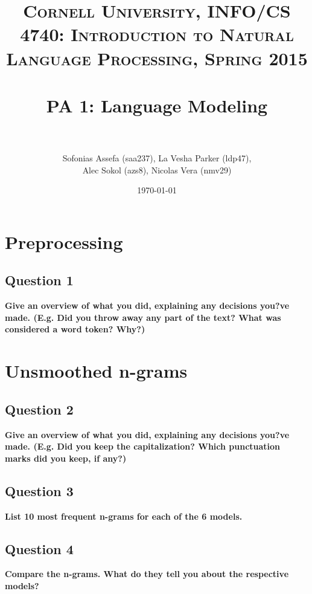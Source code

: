 \documentclass{article} %
\title{	
\normalfont \normalsize 
\textsc{Cornell University, INFO/CS 4740: Introduction to Natural Language Processing, Spring 2015} \\
\horrule{0.5pt} \\[0.4cm] %
\huge PA 1: Language Modeling \\ %
\horrule{2pt} \\[0.5cm] %
}
\author{Sofonias Assefa (saa237), La Vesha Parker (ldp47),\\
Alec Sokol (azs8), Nicolas Vera (nmv29)}
\date{\normalsize\today} %
\begin{document}
\maketitle %

\section{Preprocessing}
\subsection*{Question 1}

\textbf{Give an overview of what you did, explaining any decisions you?ve made. (E.g. Did you throw away any part of the text? What was considered a word token? Why?)}
\\


\lipsum[2] %

\section{Unsmoothed n-grams}
\subsection*{Question 2}

\textbf{Give an overview of what you did, explaining any decisions you?ve made. (E.g. Did you keep the capitalization? Which punctuation marks did you keep, if any?)}
\\


\lipsum[2] %

\subsection*{Question 3}

\textbf{List 10 most frequent n-grams for each of the 6 models.}
\\


\lipsum[2] %

\subsection*{Question 4}

\textbf{Compare the n-grams. What do they tell you about the respective
models?}
\\
\end{document}
